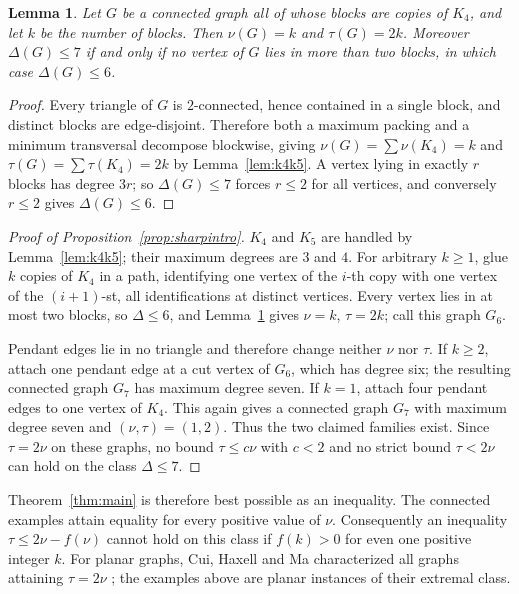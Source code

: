 \documentclass[11pt,a4paper]{amsart}
\theoremstyle{plain}
\newtheorem{lemma}[theorem]{Lemma}
\theoremstyle{definition}
\begin{document}
\begin{lemma}\label{lem:k4blocks}
Let $G$ be a connected graph all of whose blocks are copies of $K_4$, and let
$k$ be the number of blocks. Then $\nu(G)=k$ and $\tau(G)=2k$.
Moreover $\Delta(G)\le 7$ if and only if no vertex of $G$ lies in more than two
blocks, in which case $\Delta(G)\le 6$.
\end{lemma}

\begin{proof}
Every triangle of $G$ is $2$-connected, hence contained in a single block, and
distinct blocks are edge-disjoint. Therefore both a maximum packing and a
minimum transversal decompose blockwise, giving
$\nu(G)=\sum\nu(K_4)=k$ and $\tau(G)=\sum\tau(K_4)=2k$ by
Lemma~\ref{lem:k4k5}. A vertex lying in exactly $r$ blocks has degree $3r$; so
$\Delta(G)\le7$ forces $r\le2$ for all vertices, and conversely $r\le 2$ gives
$\Delta(G)\le6$.
\end{proof}

\begin{proof}[Proof of Proposition~\ref{prop:sharpintro}]
$K_4$ and $K_5$ are handled by Lemma~\ref{lem:k4k5}; their maximum degrees
are $3$ and $4$. For arbitrary $k\ge1$, glue $k$ copies of $K_4$ in a
path, identifying one vertex of the $i$-th copy with one vertex of the
$(i+1)$-st, all identifications at distinct vertices. Every vertex lies in at
most two blocks, so $\Delta\le6$, and Lemma~\ref{lem:k4blocks} gives
$\nu=k$, $\tau=2k$; call this graph $G_6$.

Pendant edges lie in no triangle and therefore change neither $\nu$ nor
$\tau$. If $k\ge2$, attach one pendant edge at a cut vertex of $G_6$, which
has degree six; the resulting connected graph $G_7$ has maximum degree seven.
If $k=1$, attach four pendant edges to one vertex of $K_4$. This again gives a
connected graph $G_7$ with maximum degree seven and $(\nu,\tau)=(1,2)$.
Thus the two claimed families exist. Since $\tau=2\nu$ on these graphs, no bound
$\tau\le c\nu$ with $c<2$ and no strict bound $\tau<2\nu$ can hold on the
class $\Delta\le 7$.
\end{proof}

Theorem~\ref{thm:main} is therefore best possible as an inequality. The
connected examples attain equality for every positive value of $\nu$.
Consequently an inequality $\tau\le2\nu-f(\nu)$ cannot hold on this class if
$f(k)>0$ for even one positive integer $k$.
For planar graphs, Cui, Haxell and Ma characterized all graphs attaining
$\tau=2\nu$ \cite{CuiHaxellMa2009}; the examples above are planar instances
of their extremal class.
\end{document}
